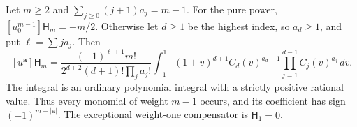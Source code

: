 \begin{theorem}
\label{pgc:coefficient}
Let $m\ge2$ and $\sum_{j\ge0}(j+1)a_j=m-1$.
For the pure power, $[u_0^{m-1}]\mathsf H_m=-m/2$.
Otherwise let $d\ge1$ be the highest index, so $a_d\ge1$, and put
$\ell=\sum j a_j$. Then
\begin{equation}\label{pgc:coefficient-formula}
 \boxed{[u^{\boldsymbol a}]\mathsf H_m=
 \frac{(-1)^{\ell+1}m!}
      {2^{d+2}(d+1)!\prod_j a_j!}
 \int_{-1}^1(1+v)^{d+1}C_d(v)^{a_d-1}
                          \prod_{j=1}^{d-1}C_j(v)^{a_j}\,dv.}
\end{equation}
The integral is an ordinary polynomial integral with a strictly positive
rational value. Thus every monomial of weight $m-1$ occurs, and its
coefficient has sign $(-1)^{m-|\boldsymbol a|}$.
The exceptional weight-one compensator is $\mathsf H_1=0$.
\end{theorem}
